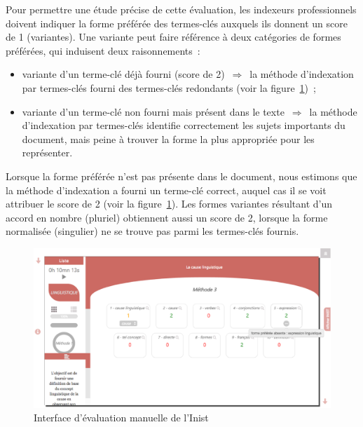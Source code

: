         Pour permettre une étude précise de cette évaluation, les indexeurs
        professionnels doivent indiquer la forme préférée des termes-clés
        auxquels ils donnent un score de 1 (variantes). Une variante peut faire
        référence à deux catégories de formes préférées, qui induisent deux
        raisonnements~:
        \begin{itemize}
          \item{variante d'un terme-clé déjà fourni (score de
                2)~$\Rightarrow$~la méthode d'indexation par termes-clés fourni
                des termes-clés redondants (voir la figure~\ref{fig:idefix})~;}
          \item{variante d'un terme-clé non fourni mais présent dans le
                texte~$\Rightarrow$~la méthode d'indexation par termes-clés
                identifie correctement les sujets importants du document, mais
                peine à trouver la forme la plus appropriée pour les
                représenter.}
        \end{itemize}

        Lorsque la forme préférée n'est pas présente dans le document, nous
        estimons que la méthode d'indexation a fourni un terme-clé correct,
        auquel cas il se voit attribuer le score de 2 (voir la
        figure~\ref{fig:idefix}). Les formes variantes résultant d'un accord en
        nombre (pluriel) obtiennent aussi un score de 2, lorsque la forme
        normalisée (singulier) ne se trouve pas parmi les termes-clés fournis.
        \begin{figure}
          \includegraphics[width=\linewidth]{include/idefix.eps}
          \caption{Interface d'évaluation manuelle de l'Inist
                   \label{fig:idefix}}
        \end{figure}

